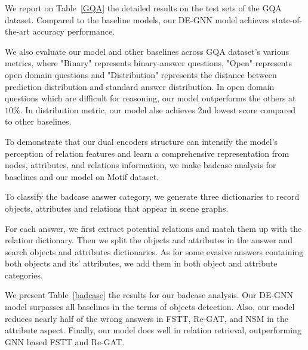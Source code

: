 \documentclass[letterpaper]{article} %
\begin{document}
We report on Table~\ref{GQA} the detailed results on the test sets of the GQA dataset. Compared to the baseline models, our DE-GNN model achieves state-of-the-art accuracy performance. 

We also evaluate our model and other baselines across GQA dataset's various metrics, where "Binary" represents binary-answer questions, "Open" represents open domain questions and "Distribution" represents the distance between prediction distribution and standard answer distribution. In open domain questions which are difficult for reasoning, our model outperforms the others at $10\%$. In distribution metric, our model alse achieves 2nd lowest score compared to other baselines.

To demonstrate that our dual encoders structure can intensify the model's perception of relation features and learn a comprehensive representation from nodes, attributes, and relations information, we make badcase analysis for baselines and our model on Motif dataset.

To classify the badcase answer category, we generate three dictionaries to record objects, attributes and relations that appear in scene graphs.

For each answer, we first extract potential relations and match them up with the relation dictionary. Then we split the objects and attributes in the answer and search objects and attributes dictionaries. As for some evasive answers containing both objects and its' attributes, we add them in both object and attribute categories. 

We present Table~\ref{badcase} the results for our badcase analysis. Our DE-GNN model surpasses all baselines in the terms of objects detection. Also, our model reduces nearly half of the wrong answers in FSTT, Re-GAT, and NSM in the attribute aspect. Finally, our model does well in relation retrieval, outperforming GNN based FSTT and Re-GAT.
\end{document}
